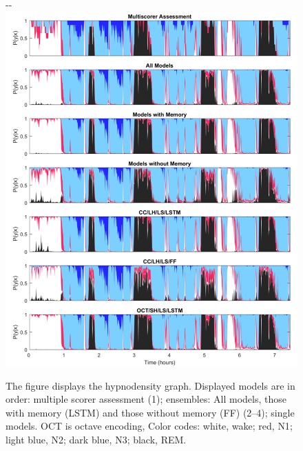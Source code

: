 \begin{figure}
\begin{adjustwidth*}{}{-\marginparsep-\marginparwidth}
    \includegraphics[width=\linewidth]{figures/paper-iii/Figure_2a}
    \caption[Hypnodensity example evaluated by different models]{The figure displays the hypnodensity graph. Displayed models are in order: multiple scorer assessment (1); ensembles: All models, those with memory (\ac{LSTM}) and those without memory (FF) (2–4); single models. OCT is octave encoding, Color codes: white, wake; red, \ac{N1}; light blue, \ac{N2}; dark blue, \ac{N3}; black, \ac{REM}.}
    \label{fig:sleep-stages:paper-iii:figure-02a}
\end{adjustwidth*}
\end{figure}

